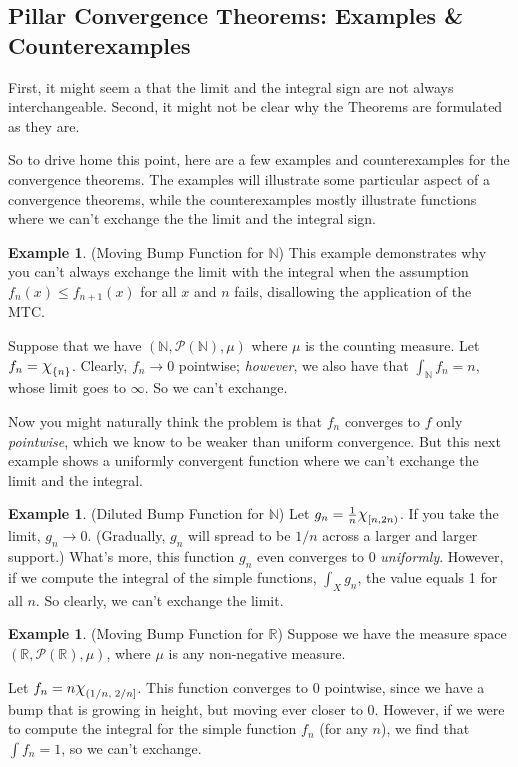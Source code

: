 \documentclass[12pt]{article}
\theoremstyle{plain}
\theoremstyle{definition}
\newtheorem{ex}[thm]{Example}
\theoremstyle{remark}
\newcommand*{\Chi}{\mbox{\large$\chi$}} %
\begin{document}
\subsection{Pillar Convergence Theorems: Examples \& Counterexamples}

First, it might seem a that the limit and the integral sign are not always interchangeable. Second, it might not be clear why the Theorems are formulated as they are.  

So to drive home this point, here are a few examples and counterexamples for the convergence theorems. The examples will illustrate some particular aspect of a convergence theorems, while the counterexamples mostly illustrate functions where we can't exchange the the limit and the integral sign.

\begin{ex}
(Moving Bump Function for $\mathbb{N}$) This example demonstrates why you can't always exchange the limit with the integral when the assumption $f_n(x)\leq f_{n+1}(x)$ for all $x$ and $n$ fails, disallowing the application of the MTC.

Suppose that we have $(\mathbb{N},\mathscr{P}(\mathbb{N}),\mu)$ where $\mu$ is the counting measure.  Let $f_n = \Chi_{\{n\}}$.  Clearly, $f_n\rightarrow 0$ pointwise; \emph{however}, we also have that $\int_\mathbb{N} f_n = n$, whose limit goes to $\infty$. So we can't exchange.

Now you might naturally think the problem is that $f_n$ converges to $f$ only \emph{pointwise}, which we know to be weaker than uniform convergence. But this next example shows a uniformly convergent function where we can't exchange the limit and the integral.
\end{ex}

\begin{ex} (Diluted Bump Function for $\mathbb{N}$)
Let $g_n = \frac{1}{n}\Chi_{[n,2n)}$. If you take the limit, $g_n\rightarrow 0$. (Gradually, $g_n$ will spread to be $1/n$ across a larger and larger support.) What's more, this function $g_n$ even converges to 0 \emph{uniformly}. However, if we compute the integral of the simple functions, $\int_X g_n$, the value equals 1 for all $n$. So clearly, we can't exchange the limit. 
\end{ex}

\begin{ex}
(Moving Bump Function for $\mathbb{R}$) Suppose we have the measure space $(\mathbb{R},\mathscr{P}(\mathbb{R}),\mu)$, where $\mu$ is any non-negative measure. 

Let $f_n = n\Chi_{(1/n,\;2/n]}$. This function converges to 0 pointwise, since we have a bump that is growing in height, but moving ever closer to 0. However, if we were to compute the integral for the simple function $f_n$ (for any $n$), we find that $\int f_n = 1$, so we can't exchange.
\end{ex} 
\end{document}
